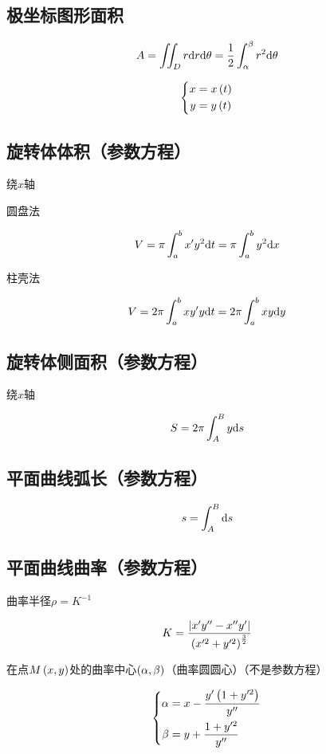 \documentclass{article}
\begin{document}
\subsection{极坐标图形面积}

\[A=\iint_Dr\mathrm d r\mathrm d\theta=\frac12\int_{\alpha}^{\beta}{r^2\mathrm d\theta}\]

\begin{definition}
    \[\left\{\begin{aligned}
            x & =x\left(t\right) \\
            y & =y\left(t\right)
        \end{aligned}\right.\]
\end{definition}

\subsection{旋转体体积（参数方程）}

绕$x$轴

圆盘法

\[V=\pi\int_a^bx^\prime y^2\mathrm d t=\pi\int_a^by^2\mathrm d x\]

柱壳法

\[V=2\pi\int_a^bxy^\prime y\mathrm d t=2\pi\int_a^bxy\mathrm d y\]

\subsection{旋转体侧面积（参数方程）}

绕$x$轴

\[S=2\pi\int_A^By\mathrm d s\]

\subsection{平面曲线弧长（参数方程）}

\[s=\int_A^B\mathrm d s\]

\subsection{平面曲线曲率（参数方程）}

曲率半径$\rho=K^{-1}$

\[K=\frac{\left|x^\prime y^{\prime\prime}-x^{\prime\prime}y^\prime\right|}{\left(x^{\prime2}+y^{\prime2}\right)^\frac32}\]

在点$M\left(x,y\right)$处的曲率中心$\left(\alpha,\beta\right)$（曲率圆圆心）（不是参数方程）

\[\left\{\begin{aligned}
        \alpha & =x-\frac{y^\prime\left(1+y^{\prime2}\right)}{y^{\prime\prime}} \\
        \beta  & =y+\frac{1+y^{\prime2}}{y^{\prime\prime}}
    \end{aligned}\right.\]
\end{document}
